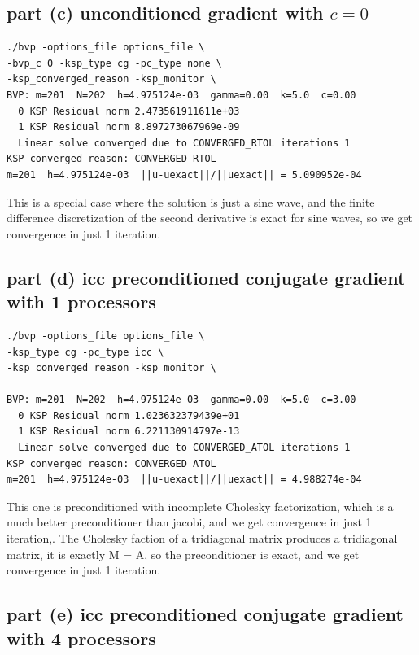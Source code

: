 \documentclass[12pt]{article}
\begin{document}
\subsection{part (c) unconditioned gradient with $c=0$}

\begin{verbatim}
./bvp -options_file options_file \
-bvp_c 0 -ksp_type cg -pc_type none \
-ksp_converged_reason -ksp_monitor \
BVP: m=201  N=202  h=4.975124e-03  gamma=0.00  k=5.0  c=0.00
  0 KSP Residual norm 2.473561911611e+03
  1 KSP Residual norm 8.897273067969e-09
  Linear solve converged due to CONVERGED_RTOL iterations 1
KSP converged reason: CONVERGED_RTOL
m=201  h=4.975124e-03  ||u-uexact||/||uexact|| = 5.090952e-04
\end{verbatim}

This is a special case where the solution is just a sine wave, and the finite difference discretization of the second derivative is exact for sine waves, so we get convergence in just 1 iteration.

\subsection{part (d) icc preconditioned conjugate gradient with 1 processors}
\begin{verbatim}
./bvp -options_file options_file \
-ksp_type cg -pc_type icc \
-ksp_converged_reason -ksp_monitor \

BVP: m=201  N=202  h=4.975124e-03  gamma=0.00  k=5.0  c=3.00
  0 KSP Residual norm 1.023632379439e+01
  1 KSP Residual norm 6.221130914797e-13
  Linear solve converged due to CONVERGED_ATOL iterations 1
KSP converged reason: CONVERGED_ATOL
m=201  h=4.975124e-03  ||u-uexact||/||uexact|| = 4.988274e-04
\end{verbatim}

This one is preconditioned with incomplete Cholesky factorization, which is a much better preconditioner than jacobi, and we get convergence in just 1 iteration,. The Cholesky faction of a tridiagonal matrix produces a tridiagonal matrix, it is exactly M = A, so the preconditioner is exact, and we get convergence in just 1 iteration.

\subsection{part (e) icc preconditioned conjugate gradient with 4 processors}
\end{document}
